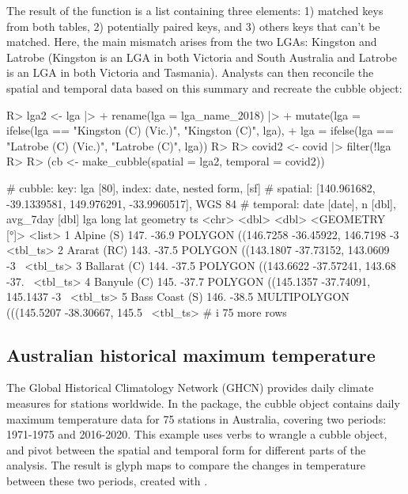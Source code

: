 \documentclass[
  shortnames]{jss}
\begin{document}
The result of the  function is a list containing three elements: 1) matched keys from both tables, 2) potentially paired keys, and 3) others keys that can't be matched. Here, the main mismatch arises from the two LGAs: Kingston and Latrobe (Kingston is an LGA in both Victoria and South Australia and Latrobe is an LGA in both Victoria and Tasmania). Analysts can then reconcile the spatial and temporal data based on this summary and recreate the cubble object:

\begin{CodeChunk}
\begin{CodeInput}
R> lga2 <- lga |>
+   rename(lga = lga_name_2018) |> 
+   mutate(lga = ifelse(lga == "Kingston (C) (Vic.)", "Kingston (C)", lga),
+          lga = ifelse(lga == "Latrobe (C) (Vic.)", "Latrobe (C)", lga))
R>   
R> covid2 <- covid |> filter(!lga %
R> 
R> (cb <- make_cubble(spatial = lga2, temporal = covid2))
\end{CodeInput}
\begin{CodeOutput}
# cubble:   key: lga [80], index: date, nested form, [sf]
# spatial:  [140.961682, -39.1339581, 149.976291, -33.9960517], WGS 84
# temporal: date [date], n [dbl], avg_7day [dbl]
  lga             long   lat                                   geometry ts      
  <chr>          <dbl> <dbl>                             <GEOMETRY [°]> <list>  
1 Alpine (S)      147. -36.9 POLYGON ((146.7258 -36.45922, 146.7198 -3~ <tbl_ts>
2 Ararat (RC)     143. -37.5 POLYGON ((143.1807 -37.73152, 143.0609 -3~ <tbl_ts>
3 Ballarat (C)    144. -37.5 POLYGON ((143.6622 -37.57241, 143.68 -37.~ <tbl_ts>
4 Banyule (C)     145. -37.7 POLYGON ((145.1357 -37.74091, 145.1437 -3~ <tbl_ts>
5 Bass Coast (S)  146. -38.5 MULTIPOLYGON (((145.5207 -38.30667, 145.5~ <tbl_ts>
# i 75 more rows
\end{CodeOutput}
\end{CodeChunk}

\hypertarget{historicaltmax}{%
\subsection{Australian historical maximum temperature}\label{historicaltmax}}

The Global Historical Climatology Network (GHCN) provides daily climate measures for stations worldwide. In the  package, the cubble object  contains daily maximum temperature data for 75 stations in Australia, covering two periods: 1971-1975 and 2016-2020. This example uses  verbs to wrangle a cubble object, and pivot between the spatial and temporal form for different parts of the analysis. The result is glyph maps to compare the changes in temperature between these two periods, created with .
\end{document}
